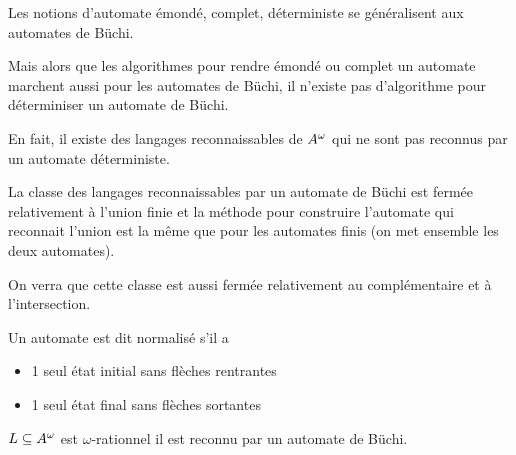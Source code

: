 Les notions d'automate émondé, complet, déterministe se généralisent aux automates de Büchi.


Mais alors que les algorithmes pour rendre émondé ou complet un automate marchent aussi
pour les automates de Büchi, il n'existe pas d'algorithme pour déterminiser un automate de Büchi.

En fait, il existe des langages reconnaissables de $A^{\omega}$ qui ne sont pas reconnus par un automate déterministe.



La classe des langages reconnaissables par un automate de Büchi est fermée relativement à l'union finie
et la méthode pour construire l'automate qui reconnait l'union est la même que pour les automates finis (on met ensemble
les deux automates).

On verra que cette classe est aussi fermée relativement au complémentaire et à l'intersection.


\begin{definition}
	Un automate est dit normalisé s'il a

	\begin{itemize}
		\item 1 seul état initial sans flèches rentrantes
		\item 1 seul état final sans flèches sortantes
	\end{itemize}
\end{definition}

\begin{theorem}
	$L \subseteq A^{\omega}$ est $\omega$-rationnel \ssi il est reconnu par un automate de Büchi.
\end{theorem}

